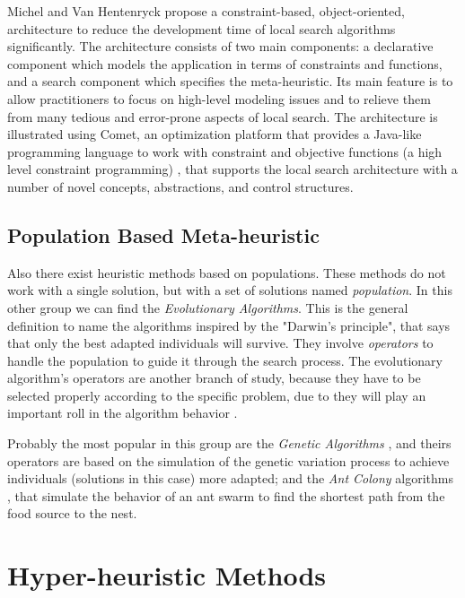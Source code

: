 Michel and Van Hentenryck \cite{Michel2002} propose a constraint-based, object-oriented, architecture to reduce the development time of local search algorithms significantly. The architecture consists of two main components: a declarative component which models the application in terms of constraints and functions, and a search component which specifies the meta-heuristic. Its main feature is to allow practitioners to focus on high-level modeling issues and to relieve them from many tedious and error-prone aspects of local search. The architecture is illustrated using {\sc Comet}, an optimization platform that provides a Java-like programming language to work with constraint and objective functions (a high level constraint programming) \cite{Comet, Michel2005}, that supports the local search architecture with a number of novel concepts, abstractions, and control structures.

\subsection{Population Based Meta-heuristic}

Also there exist heuristic methods based on populations. These methods do not work with a single solution, but with a set of solutions named {\it population}. In this other group we can find the {\it Evolutionary Algorithms}. This is the general definition to name the algorithms inspired by the "Darwin's principle", that says that only the best adapted individuals will survive. They involve {\it operators} to handle the population to guide it through the search process. The evolutionary algorithm's operators are another branch of study, because they have to be selected properly according to the specific problem, due to they will play an important roll in the algorithm behavior \cite{Maturana2012}. 

Probably the most popular in this group are the {\it Genetic Algorithms} \cite{Reeves2010}, and theirs operators are based on the simulation of the genetic variation  process to achieve individuals (solutions in this case) more adapted; and the {\it Ant Colony} algorithms \cite{Dorigo2010}, that simulate the behavior of an ant swarm to find the shortest path from the food source to the nest.

\section{Hyper-heuristic Methods}
\label{sec:hyper}

